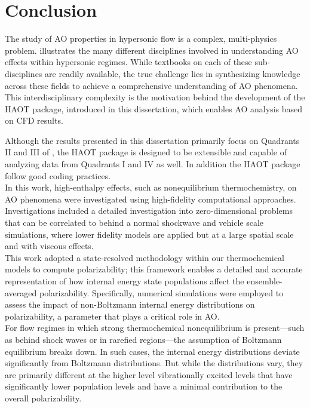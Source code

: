 \chapter{Conclusion\label{ch:ch6}} 
The study of \gls{AO} properties in hypersonic flow is a complex, multi-physics
problem.  illustrates the many different disciplines
involved in understanding \gls{AO} effects within hypersonic regimes. While
textbooks on each of these sub-disciplines are readily available, the true
challenge lies in synthesizing knowledge across these fields to achieve a
comprehensive understanding of \gls{AO} phenomena. This interdisciplinary
complexity is the motivation behind the development of the \gls{HAOT} package,
introduced in this dissertation, which enables \gls{AO} analysis based on
\gls{CFD} results.


Although the results presented in this dissertation primarily focus on
Quadrants II and III of , the \gls{HAOT}
package is designed to be extensible and capable of analyzing data from
Quadrants I and IV as well. In addition the \gls{HAOT} package follow good
coding practices. \\

In this work, high-enthalpy effects, such as nonequilibrium thermochemistry, on
\gls{AO} phenomena were investigated using high-fidelity computational
approaches. Investigations included a detailed investigation into
zero-dimensional problems that can be correlated to behind a normal shockwave
and vehicle scale simulations, where lower fidelity models are applied but at a
large spatial scale and with viscous effects. \\

This work adopted a state-resolved methodology within our thermochemical models to compute polarizability; this framework enables a detailed and accurate representation of how internal energy state populations affect the ensemble-averaged polarizability.
Specifically, numerical simulations were employed to assess the impact of
non-Boltzmann internal energy distributions on polarizability, a parameter that
plays a critical role in \gls{AO}. \\

For flow regimes in which strong thermochemical nonequilibrium is present—such as behind shock waves or in rarefied regions—the assumption of Boltzmann equilibrium breaks down. In such cases, the internal energy distributions deviate significantly from Boltzmann distributions.
But while the distributions vary, they are primarily different at the higher
level vibrationally excited levels that have significantly lower population
levels and have a minimal contribution to the overall polarizability.\\

